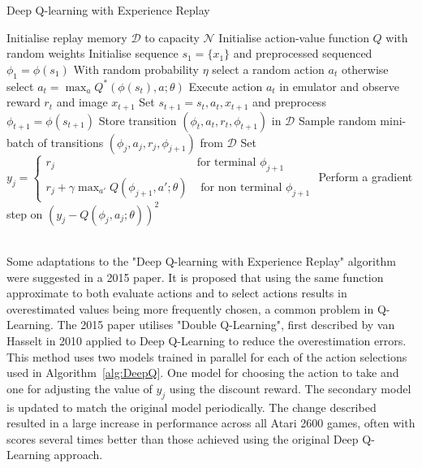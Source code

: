 \documentclass{article}
\begin{document}
\begin{algorithm}
\caption{Deep Q-learning with Experience Replay \cite{MnihPlayingLearning}}\label{alg:DeepQ}
\begin{algorithmic}
\State  Initialise replay  memory $\mathcal{D}$  to capacity $\mathcal{N}$
\State Initialise action-value function $Q$ with random weights
    \State Initialise sequence $s_1 = \{x_1\}$ and preprocessed sequenced $\phi_1 = \phi(s_1)$
        \State With random probability $\eta$ select a random action $a_t$
        \State otherwise select $a_t=\max_aQ^*(\phi(s_t),a;\theta)$
        \State Execute action $a_t$ in emulator and observe reward $r_t$ and image $x_{t+1}$
        \State Set $s_{t+1} = s_t,a_t,x_{t+1}$ and preprocess $\phi_{t+1} = \phi(s_{t+1})$
        \State Store transition $(\phi_t, a_t, r_t, \phi_{t+1})$ in $\mathcal{D}$
        \State Sample random mini-batch of transitions $(\phi_j, a_j, r_j, \phi_{j+1})$ from $\mathcal{D}$
        \State Set $y_j = \begin{cases}
                    r_j & \text{for terminal } \phi_{j+1}\\
                    r_j + \gamma \max_{a'}Q(\phi_{j+1},a';\theta) & \text{ for non terminal } \phi_{j+1}
                \end{cases}
                $
        \State Perform a gradient step on $(y_j - Q(\phi_j, a_j; \theta))^2$
    \EndFor
\EndFor
\end{algorithmic}
\end{algorithm}

\\

Some adaptations to the "Deep Q-learning with Experience Replay" algorithm were suggested in a 2015 paper\cite{vanHasselt2015DeepQ-learning}. It is proposed that using the same function approximate to both evaluate actions and to select actions results in overestimated values being more frequently chosen, a common problem in Q-Learning\cite{Thrun1993IssuesLearning}. The 2015 paper utilises "Double Q-Learning", first described by van Hasselt in 2010\cite{VanHasselt2010DoubleQ-learning} applied to Deep Q-Learning to reduce the overestimation errors. This method uses two models trained in parallel for each of the action selections used in Algorithm~\ref{alg:DeepQ}. One model for choosing the action to take and one for adjusting the value of $y_j$ using the discount reward. The secondary model is updated to match the original model periodically. 
The change described resulted in a large increase in performance across all Atari 2600 games, often with scores several times better than those achieved using the original Deep Q-Learning approach. 
\end{document}
